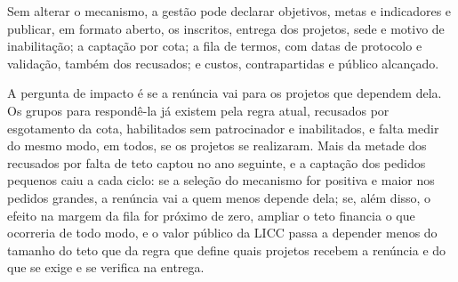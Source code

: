 \documentclass[12pt,a4paper]{article}
\begin{document}
Sem alterar o mecanismo, a gestão pode declarar objetivos, metas e indicadores e publicar, em
formato aberto, os inscritos, entrega dos projetos, sede e motivo de inabilitação; a captação por
cota; a fila de termos, com datas de protocolo e validação, também dos recusados; e custos,
contrapartidas e público alcançado.

A pergunta de impacto é se a renúncia vai para os projetos que dependem dela. Os grupos para
respondê-la já existem pela regra atual, recusados por esgotamento da cota, habilitados sem
patrocinador e inabilitados, e falta medir do mesmo modo, em todos, se os projetos se realizaram.
Mais da metade dos recusados por falta de teto captou no ano seguinte, e a captação dos pedidos
pequenos caiu a cada ciclo: se a seleção do mecanismo for positiva e maior nos pedidos grandes, a
renúncia vai a quem menos depende dela; se, além disso, o efeito na margem da fila for próximo de
zero, ampliar o teto financia o que ocorreria de todo modo, e o valor público da LICC passa a
depender menos do tamanho do teto que da regra que define quais projetos recebem a renúncia e do que
se exige e se verifica na entrega.
\end{document}
